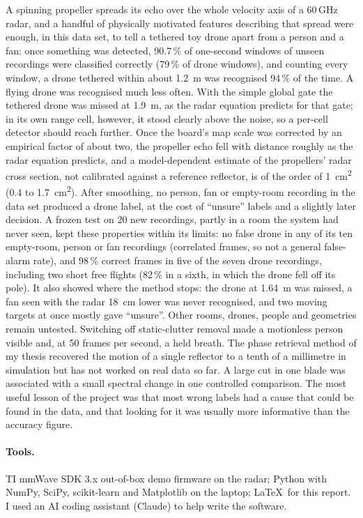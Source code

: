 \documentclass[11pt,a4paper]{article}
\begin{document}
A spinning propeller spreads its echo over the whole velocity axis of a 60\,GHz radar, and a handful of physically motivated features describing that spread were enough, in this data set, to tell a tethered toy drone apart from a person and a fan: once something was detected, 90.7\,\% of one-second windows of unseen recordings were classified correctly (79\,\% of drone windows), and counting every window, a drone tethered within about \SI{1.2}{m} was recognised 94\,\% of the time. A flying drone was recognised much less often. With the simple global gate the tethered drone was missed at \SI{1.9}{m}, as the radar equation predicts for that gate; in its own range cell, however, it stood clearly above the noise, so a per-cell detector should reach further. Once the board's map scale was corrected by an empirical factor of about two, the propeller echo fell with distance roughly as the radar equation predicts, and a model-dependent estimate of the propellers' radar cross section, not calibrated against a reference reflector, is of the order of \SI{1}{cm^2} (0.4 to \SI{1.7}{cm^2}). After smoothing, no person, fan or empty-room recording in the data set produced a drone label, at the cost of ``unsure'' labels and a slightly later decision. A frozen test on 20 new recordings, partly in a room the system had never seen, kept these properties within its limits: no false drone in any of its ten empty-room, person or fan recordings (correlated frames, so not a general false-alarm rate), and 98\,\% correct frames in five of the seven drone recordings, including two short free flights (82\,\% in a sixth, in which the drone fell off its pole). It also showed where the method stops: the drone at \SI{1.64}{m} was missed, a fan seen with the radar \SI{18}{cm} lower was never recognised, and two moving targets at once mostly gave ``unsure''. Other rooms, drones, people and geometries remain untested. Switching off static-clutter removal made a motionless person visible and, at 50 frames per second, a held breath. The phase retrieval method of my thesis recovered the motion of a single reflector to a tenth of a millimetre in simulation but has not worked on real data so far. A large cut in one blade was associated with a small spectral change in one controlled comparison. The most useful lesson of the project was that most wrong labels had a cause that could be found in the data, and that looking for it was usually more informative than the accuracy figure.

\paragraph{Tools.} TI mmWave SDK 3.x out-of-box demo firmware on the radar; Python with NumPy, SciPy, scikit-learn and Matplotlib on the laptop; \LaTeX\ for this report. I used an AI coding assistant (Claude) to help write the software.
\end{document}

